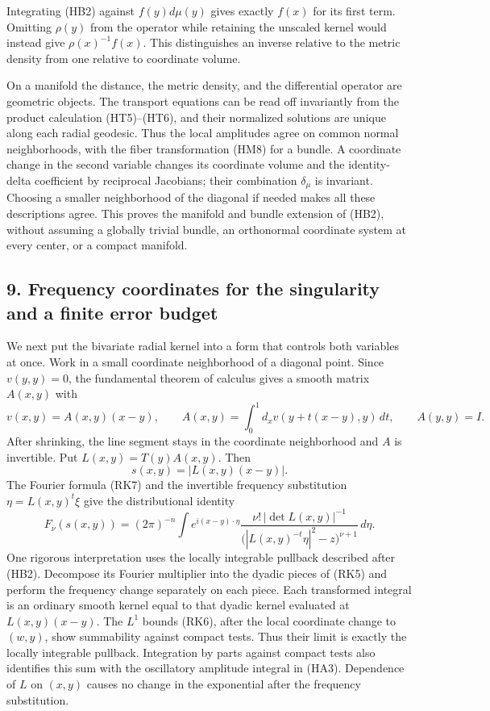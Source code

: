 \documentclass[
  11pt,
]{article}
\begin{document}
Integrating (HB2) against \(f(y)d\mu(y)\) gives exactly \(f(x)\) for its
first term. Omitting \(\rho(y)\) from the operator while retaining the
unscaled kernel would instead give \(\rho(x)^{-1}f(x)\). This
distinguishes an inverse relative to the metric density from one
relative to coordinate volume.

On a manifold the distance, the metric density, and the differential
operator are geometric objects. The transport equations can be read off
invariantly from the product calculation (HT5)--(HT6), and their
normalized solutions are unique along each radial geodesic. Thus the
local amplitudes agree on common normal neighborhoods, with the fiber
transformation (HM8) for a bundle. A coordinate change in the second
variable changes its coordinate volume and the identity-delta
coefficient by reciprocal Jacobians; their combination \(\delta_\mu\) is
invariant. Choosing a smaller neighborhood of the diagonal if needed
makes all these descriptions agree. This proves the manifold and bundle
extension of (HB2), without assuming a globally trivial bundle, an
orthonormal coordinate system at every center, or a compact manifold.

\subsection{9. Frequency coordinates for the singularity and a finite
error
budget}\label{frequency-coordinates-for-the-singularity-and-a-finite-error-budget}

We next put the bivariate radial kernel into a form that controls both
variables at once. Work in a small coordinate neighborhood of a diagonal
point. Since \(v(y,y)=0\), the fundamental theorem of calculus gives a
smooth matrix \(A(x,y)\) with \[
 v(x,y)=A(x,y)(x-y),\qquad
 A(x,y)=\int_0^1d_xv(y+t(x-y),y)\,dt,
 \qquad A(y,y)=I.                                             \tag{HA1}
\] After shrinking, the line segment stays in the coordinate
neighborhood and \(A\) is invertible. Put \(L(x,y)=T(y)A(x,y)\). Then \[
                 s(x,y)=|L(x,y)(x-y)|.                        \tag{HA2}
\] The Fourier formula (RK7) and the invertible frequency substitution
\(\eta=L(x,y)^t\xi\) give the distributional identity \[
 F_\nu(s(x,y))=(2\pi)^{-n}\int e^{i(x-y)\cdot\eta}
       \frac{\nu!\,|\det L(x,y)|^{-1}}
            {\bigl(|L(x,y)^{-t}\eta|^2-z\bigr)^{\nu+1}}\,d\eta.
                                                               \tag{HA3}
\] One rigorous interpretation uses the locally integrable pullback
described after (HB2). Decompose its Fourier multiplier into the dyadic
pieces of (RK5) and perform the frequency change separately on each
piece. Each transformed integral is an ordinary smooth kernel equal to
that dyadic kernel evaluated at \(L(x,y)(x-y)\). The \(L^1\) bounds
(RK6), after the local coordinate change to \((w,y)\), show summability
against compact tests. Thus their limit is exactly the locally
integrable pullback. Integration by parts against compact tests also
identifies this sum with the oscillatory amplitude integral in (HA3).
Dependence of \(L\) on \((x,y)\) causes no change in the exponential
after the frequency substitution.
\end{document}
